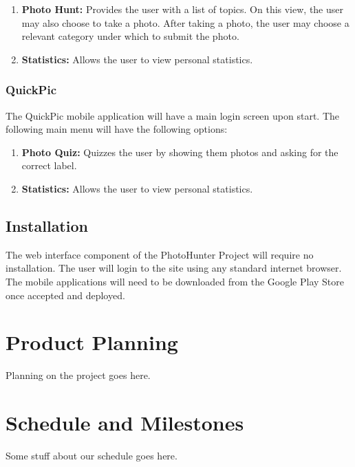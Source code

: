 \documentclass{article}
\begin{document}
\begin{enumerate}

  \item \textbf{Photo Hunt:} Provides the user with a list of topics. On this
        view, the user may also choose to take a photo. After taking a photo, the user
        may choose a relevant category under which to submit the photo.

  \item \textbf{Statistics:} Allows the user to view personal statistics.

\end{enumerate}

\subsubsection{QuickPic}
The QuickPic mobile application will have a main login screen upon start. The
following main menu will have the following options:

\begin{enumerate}

  \item \textbf {Photo Quiz:} Quizzes the user by showing them photos and
        asking for the correct label.

  \item \textbf{Statistics:} Allows the user to view personal statistics.

\end{enumerate}

\subsection{Installation}
The web interface component of the PhotoHunter Project will require no
installation. The user will login to the site using any standard internet
browser. The mobile applications will need to be downloaded from the Google
Play Store once accepted and deployed.



\section{Product Planning}
Planning on the project goes here.




\section{Schedule and Milestones}
Some stuff about our schedule goes here.
\end{document}
